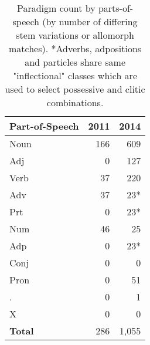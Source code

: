 \documentclass[11pt]{article}
\newif\ifcameraready
\begin{document}
\begin{table}[h]
    \begin{center}
        \begin{tabular}{|l|rr|}
            \hline
            \bf Part-of-Speech & \bf 2011 & \bf 2014 \\
            \hline
            \sc Noun           & 166      & 609 \\
            \sc Adj            & 0        & 127 \\
            \sc Verb           & 37       & 220 \\
            \sc Adv            & 37       & 23* \\
            \sc Prt            & 0        & 23* \\
            \sc Num            & 46       & 25 \\
            \sc Adp            & 0        & 23* \\
            \sc Conj           & 0        & 0 \\
            \sc Pron           & 0        & 51 \\
            \sc .              & 0        & 1  \\
            \sc X              & 0        & 0 \\
            \hline
            \bf Total          & 286      & 1,055 \\
            \hline
        \end{tabular}
    \end{center}
    \caption{Paradigm count by parts-of-speech (by number of differing
    stem variations or allomorph matches). *Adverbs, adpositions and particles
    share same "inflectional" classes which are used to select possessive and
    clitic combinations.}
\end{table}

\ifcameraready
\section*{Acknowledgements}


\fi



\end{document}
